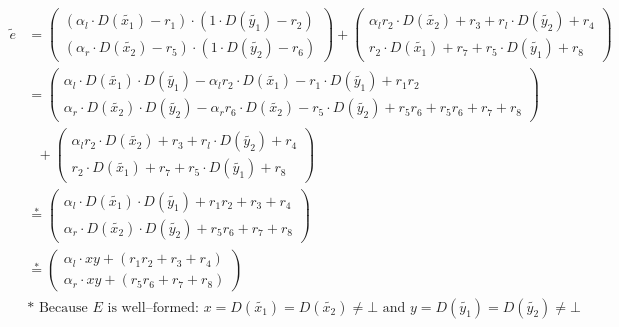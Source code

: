 \begin{align*}
  \widetilde{e} & =
  \begin{pmatrix}
    (\alpha_l \cdot D(\widetilde{x_1})-r_1) \cdot
    (1        \cdot D(\widetilde{y_1})-r_2) \\
    (\alpha_r \cdot D(\widetilde{x_2})-r_5) \cdot
    (1        \cdot D(\widetilde{y_2})-r_6)
  \end{pmatrix}
  +
  \begin{pmatrix}
    \alpha_lr_2 \cdot D(\widetilde{x_2}) + r_3 +
    r_l         \cdot D(\widetilde{y_2}) + r_4 \\
    r_2         \cdot D(\widetilde{x_1}) + r_7 +
    r_5         \cdot D(\widetilde{y_1}) + r_8
  \end{pmatrix} \\
%
  & =
  \begin{pmatrix}
    \alpha_l \cdot D(\widetilde{x_1}) \cdot D(\widetilde{y_1})
    -\alpha_lr_2 \cdot D(\widetilde{x_1})
    -r_1 \cdot D(\widetilde{y_1})
    +r_1r_2 \\
    \alpha_r \cdot D(\widetilde{x_2}) \cdot D(\widetilde{y_2})
    -\alpha_rr_6 \cdot D(\widetilde{x_2})
    -r_5 \cdot D(\widetilde{y_2})
    + r_5r_6
    + r_5r_6 + r_7 + r_8
  \end{pmatrix} \\
  &\ \ \ +
  \begin{pmatrix}
    \alpha_lr_2 \cdot D(\widetilde{x_2}) + r_3 +
    r_l         \cdot D(\widetilde{y_2}) + r_4 \\
    r_2         \cdot D(\widetilde{x_1}) + r_7 +
    r_5         \cdot D(\widetilde{y_1}) + r_8
  \end{pmatrix} \\
%
  & \stackrel{*}{=}
  \begin{pmatrix}
    \alpha_l \cdot D(\widetilde{x_1}) \cdot D(\widetilde{y_1})
    + r_1r_2 + r_3 + r_4 \\
    \alpha_r \cdot D(\widetilde{x_2}) \cdot D(\widetilde{y_2})
    + r_5r_6 + r_7 + r_8
  \end{pmatrix} \\
%
  & \stackrel{*}{=}
  \begin{pmatrix}
    \alpha_l \cdot xy + (r_1r_2 + r_3 + r_4) \\
    \alpha_r \cdot xy + (r_5r_6 + r_7 + r_8)
  \end{pmatrix} \\
%
  &\text{* Because $E$ is well--formed: $x = D(\widetilde{x_1}) =
D(\widetilde{x_2}) \neq \bot$ and $y = D(\widetilde{y_1}) = D(\widetilde{y_2})
\neq \bot$ }
%
\end{align*}

